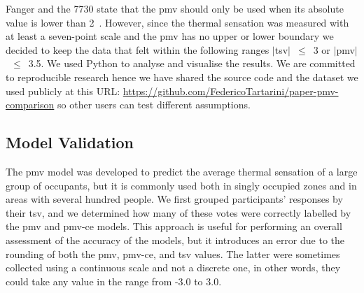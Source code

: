 Fanger and the \gls{7730} state that the \ac{pmv} should only be used when its absolute value is lower than 2~\cite{Fanger1970, iso7730}.
However, since the thermal sensation was measured with at least a seven-point scale and the \ac{pmv} has no upper or lower boundary we decided to keep the data that felt within the following ranges $|$\ac{tsv}$|$~$\leq$~\num{3} or $|$\ac{pmv}$|$~$\leq$~\num{3.5}.
We used Python to analyse and visualise the results.
We are committed to reproducible research hence we have shared the source code and the dataset we used publicly at this URL: \url{https://github.com/FedericoTartarini/paper-pmv-comparison} so other users can test different assumptions.

\subsection{Model Validation}\label{subsec:model-validation}
The \ac{pmv} model was developed to predict the average thermal sensation of a large group of occupants, but it is commonly used both in singly occupied zones and in areas with several hundred people.
We first grouped participants' responses by their \ac{tsv}, and we determined how many of these votes were correctly labelled by the \ac{pmv} and \ac{pmv-ce} models.
This approach is useful for performing an overall assessment of the accuracy of the models, but it introduces an error due to the rounding of both the \ac{pmv}, \ac{pmv-ce}, and \ac{tsv} values.
The latter were sometimes collected using a continuous scale and not a discrete one, in other words, they could take any value in the range from -3.0 to 3.0.

